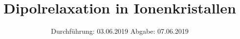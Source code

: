 

\subject{VERSUCH NUMMER 48}
\title{Dipolrelaxation in Ionenkristallen}
\date{
  Durchführung: 03.06.2019
  \hspace{3em}
  Abgabe: 07.06.2019
}



\thispagestyle{empty}
\maketitle
\thispagestyle{empty}
\tableofcontents
\newpage
\setcounter{page}{1}


% 




\nocite{*}
\printbibliography


